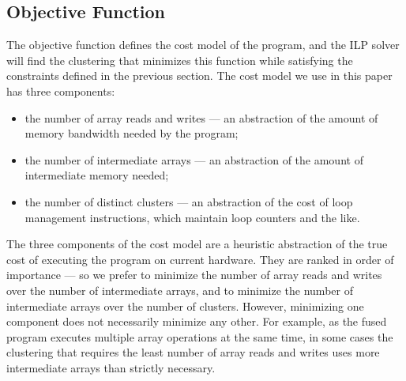 \subsection{Objective Function}
\label{s:ObjectiveFunction}
The objective function defines the cost model of the program, and the ILP solver will find the clustering that minimizes this function while satisfying the constraints defined in the previous section. The cost model we use in this paper has three components:
\begin{itemize}
\item
the number of array reads and writes --- an abstraction of the amount of memory bandwidth needed by the program; 
\item
the number of intermediate arrays --- an abstraction of the amount of intermediate memory needed; 
\item
the number of distinct clusters --- an abstraction of the cost of loop management instructions, which maintain loop counters and the like.
\end{itemize}

The three components of the cost model are a heuristic abstraction of the true cost of executing the program on current hardware. They are ranked in order of importance --- so we prefer to minimize the number of array reads and writes over the number of intermediate arrays, and to minimize the number of intermediate arrays over the number of clusters. However, minimizing one component does not necessarily minimize any other. For example, as the fused program executes multiple array operations at the same time, in some cases the clustering that requires the least number of array reads and writes uses more intermediate arrays than strictly necessary.

